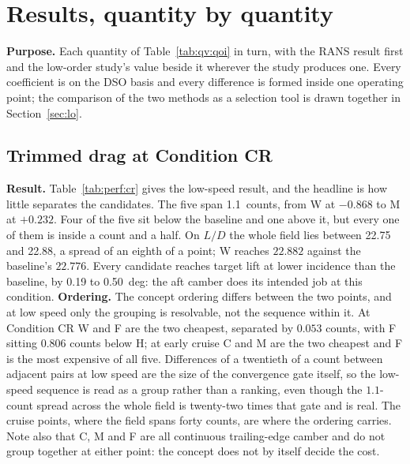 \section{Results, quantity by quantity}
\label{sec:results}
\label{sec:perf}

\textbf{Purpose.} Each quantity of Table~\ref{tab:qv:qoi} in turn, with the RANS result first and
the low-order study's value beside it wherever the study produces one. Every coefficient is on the
DSO basis and every difference is formed inside one operating point; the comparison of the two
methods as a selection tool is drawn together in Section~\ref{sec:lo}.

\subsection{Trimmed drag at Condition CR}
\label{sec:cr}
\label{sec:perf:cr}
\label{sec:project:result}

\textbf{Result.} Table~\ref{tab:perf:cr} gives the low-speed result, and the headline is how
little separates the candidates. The five span \SI{1.1}{counts}, from W at $-0.868$ to M at
$+0.232$. Four of the five sit below the baseline and one above it, but every one of them is
inside a count and a half. On $L/D$ the whole field lies between 22.75 and 22.88, a spread of an
eighth of a point; W reaches $22.882$ against the baseline's $22.776$. Every candidate reaches target lift
at lower incidence than the baseline, by 0.19 to 0.50~deg: the aft camber does its intended job
at this condition.
\textbf{Ordering.} The concept ordering differs between the two points, and at low speed only
the grouping is resolvable, not the sequence within it. At Condition CR W and F are the two cheapest, separated by
$0.053$ counts, with F sitting $0.806$ counts below H; at early cruise C and M are the two
cheapest and F is the most expensive of all five. Differences of a twentieth of a count between adjacent pairs at low speed
are the size of the convergence gate itself, so the low-speed sequence is read as a group rather
than a ranking, even though the $1.1$-count spread across the whole field is twenty-two times
that gate and is real. The cruise points, where the field spans forty counts, are where
the ordering carries. Note also that C, M and F are all continuous trailing-edge camber and do
not group together at either point: the concept does not by itself decide the cost.

